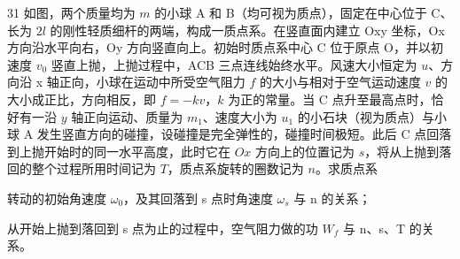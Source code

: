 \begin{problem}[理论考试][质点系与空气阻力]{31}
  如图，两个质量均为 $m$ 的小球 A 和 B（均可视为质点），固定在中心位于 C、长为 $2l$ 的刚性轻质细杆的两端，构成一质点系。在竖直面内建立 Oxy 坐标，Ox 方向沿水平向右，Oy 方向竖直向上。初始时质点系中心 C 位于原点 O，并以初速度 $v_{0}$ 竖直上抛，上抛过程中，ACB 三点连线始终水平。风速大小恒定为 $u$、方向沿 x 轴正向，小球在运动中所受空气阻力 $f$ 的大小与相对于空气运动速度 $v$ 的大小成正比，方向相反，即 $f = -kv$，$k$ 为正的常量。当 C 点升至最高点时，恰好有一沿 $y$ 轴正向运动、质量为 $m_1$、速度大小为 $u_1$ 的小石块（视为质点）与小球 A 发生竖直方向的碰撞，设碰撞是完全弹性的，碰撞时间极短。此后 C 点回落到上抛开始时的同一水平高度，此时它在 $Ox$ 方向上的位置记为 $s$，将从上抛到落回的整个过程所用时间记为 $T$，质点系旋转的圈数记为 $n$。求质点系
  \begin{subproblem}
    转动的初始角速度 $\omega_{0}$，及其回落到 s 点时角速度 $\omega_{s}$ 与 n 的关系；
  \end{subproblem}
  \begin{subproblem}
    从开始上抛到落回到 s 点为止的过程中，空气阻力做的功 $W_{f}$ 与 n、s、T 的关系。
  \end{subproblem}
\end{problem}